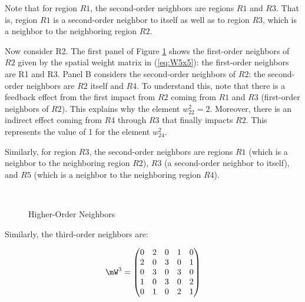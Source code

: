 \documentclass[english,12pt]{book}\usepackage[]{graphicx}\usepackage[]{xcolor}
\begin{document}
Note that for region $R1$, the second-order neighbors are regions $R1$ and $R3$. That is, region $R1$ is a second-order neighbor to itself as well as to region $R3$, which is a neighbor to the neighboring region $R2$. 

Now consider R2. The first panel of Figure \ref{fig:example_hon} shows the first-order neighbors of $R2$ given by the spatial weight matrix in (\ref{eq:W5x5}): the first-order neighbors are R1 and R3. Panel B considers the second-order neighbors of $R2$: the second-order neighbors are $R2$ itself and $R4$. To understand this, note that there is a feedback effect from the first impact from $R2$ coming from $R1$ and $R3$ (first-order neighbors of $R2$). This explains why the element $w^2_{22} = 2$. Moreover, there is an indirect effect coming from $R4$ through $R3$ that finally impacts $R2$.  This represents the value of 1 for the element $w^2_{24}$.

Similarly, for region $R3$, the second-order neighbors are regions $R1$ (which is a neighbor to the neighboring region $R2$), $R3$ (a second-order neighbor to itself), and $R5$ (which is a neighbor to the neighboring region $R4$). 

\begin{figure}[ht]
\caption{Higher-Order Neighbors}
\label{fig:example_hon}
\centering
{}
\\
\vspace{1cm}
\end{figure}

Similarly, the third-order neighbors are: 


\begin{equation*}
\mW^3 = \begin{pmatrix}
      0 & 2 & 0 & 1 & 0 \\
      2 & 0 & 3 & 0 & 1 \\
      0 & 3 & 0 & 3 & 0 \\
      1 & 0 & 3 & 0 & 2 \\
      0 & 1 & 0 & 2 & 1
      \end{pmatrix}
\end{equation*}
\end{document}
